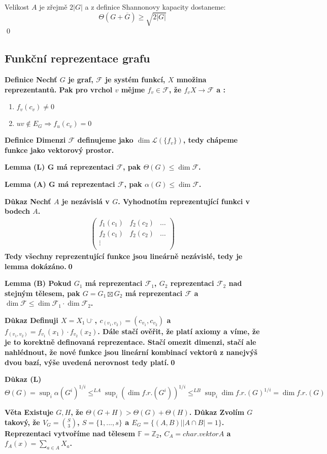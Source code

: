 \documentclass[a4paper,12pt,titlepage]{article}
\newcommand{\shn}{\Theta}
\newcommand{\lm}{\smallskip\noindent\bf Lemma\rm{} }
\newcommand{\dk}{\smallskip\noindent\bf Důkaz\rm{} }
\newcommand{\df}{\smallskip\noindent\bf Definice\rm{} }
\newcommand{\vt}{\smallskip\noindent\bf Věta\rm{} }
\newcommand{\F}{\mathcal{F}}
\renewcommand{\L}{\mathcal{L}}
\newcommand{\Fr}{\mathbb{F}}
\newcommand{\Z}{\mathbb{Z}}
\renewcommand{\L}{\mathcal{L}}
\begin{document}
Velikost $A$ je zřejmě $2|G|$ a z definice Shannonovy kapacity dostaneme:
$$\shn(G + \overline{G}) \ge \sqrt{2|G|}$$
\qed


\subsection{Funkční reprezentace grafu}
\df Nechť $G$ je graf, $\F$ je systém funkcí, $X$ množina reprezentantů. Pak pro vrchol $v$ mějme $f_v \in \F$, že $f_v X \to \F$ a :
\begin{enumerate}
	\item $f_v(c_v) \neq 0$
	\item $uv \notin E_G \Rightarrow f_u(c_v) = 0$
\end{enumerate}

\df Dimenzi $\F$ definujeme jako $\dim\L(\{f_v\})$, tedy chápeme funkce jako vektorový prostor.


\lm(L) G má reprezentaci $\F$, pak $\shn(G) \leq \dim \F$.

\lm(A) G má reprezentaci $\F$, pak $\alpha(G) \leq \dim \F$.\par
\dk Nechť $A$ je nezávislá v $G$. Vyhodnotím reprezentující funkci v bodech $A$.
\begin{align}
\left(
	\begin{matrix}
		f_1(c_1) & f_2(c_2) & \dots \\
		f_2(c_1) & f_2(c_2) & \dots \\
		\vdots &&\\
	\end{matrix}\right)
\end{align}
Tedy všechny reprezentující funkce jsou lineárně nezávislé, tedy je lemma dokázáno.\qed

\lm(B) Pokud $G_1$ má reprezentaci $\F_1$, $G_2$ reprezentaci $\F_2$ nad stejným tělesem, pak $G = G_1 \boxtimes G_2$ má reprezentaci $\F$ a $\dim\F \leq \dim\F_1 \cdot \dim\F_2$.

\dk Definuji $X = X_1 \cup^.$, $c_(v_1,v_2) = (c_{v_1}, c_{v_2})$ a $f_(v_1, v_2) = f_{v_1}(x_1) \cdot f_{v_2}(x_2)$.
Dále stačí ověřit, že platí axiomy a víme, že je to korektně definovaná reprezentace. Stačí omezit dimenzi, stačí ale nahlédnout, že nové funkce jsou lineární kombinací vektorů z nanejvýš dvou bazí, výše uvedená nerovnost tedy platí.\qed

\dk(L) $\shn(G) = \sup_i \alpha(G^i)^{1/i} \leq^{LA} \sup_i(\dim f.r.(G^i))^{1/i} \leq^{LB} \sup_i\dim f.r. (G)^{1/i} = \dim f.r.(G)$

\vt Existuje $G, H$, že $\shn(G+H) > \shn(G) + \shn(H)$.
\dk Zvolím $G$ takový, že $V_G=\binom{S}{3}$, $S = \{1, ..., s\}$ a $E_G = \{ (A, B) | |A\cap B| = 1\}$. Reprezentaci vytvoříme nad tělesem $\Fr = \Z_2$, $C_A = char. vektor A$ a $f_A(x) = \sum_{a\in A} X_a$.
\end{document}
